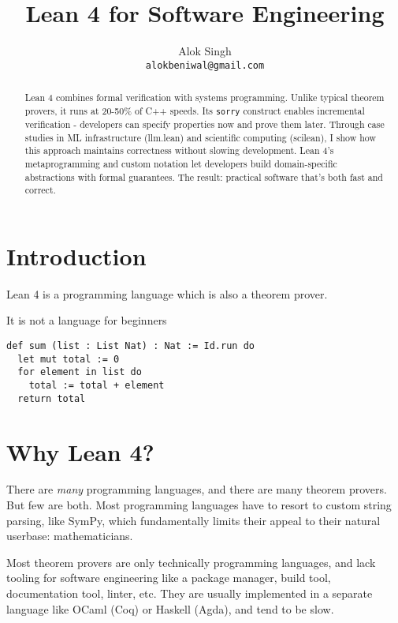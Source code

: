 \documentclass{article}
\title{Lean 4 for Software Engineering}
\author{
  Alok Singh \\
  \texttt{alokbeniwal@gmail.com} \\
}
\begin{document}
\maketitle

\begin{abstract}
  Lean 4 combines formal verification with systems programming. Unlike typical
  theorem provers, it runs at 20-50\% of C++ speeds. Its \texttt{sorry} construct
  enables incremental verification - developers can specify properties now and
  prove them later. Through case studies in ML infrastructure (llm.lean) and
  scientific computing (scilean), I show how this approach maintains correctness
  without slowing development. Lean 4's metaprogramming and custom notation let
  developers build domain-specific abstractions with formal guarantees. The result:
  practical software that's both fast and correct.
\end{abstract}

\tableofcontents

\section{Introduction}
Lean 4 is a programming language which is also a theorem prover.

It is not a language for beginners

\begin{verbatim}
def sum (list : List Nat) : Nat := Id.run do
  let mut total := 0
  for element in list do
    total := total + element
  return total
\end{verbatim}

\section{Why Lean 4?}

There are \textit{many} programming languages, and there are many theorem provers. But few are both. Most programming languages have to resort to custom string parsing, like SymPy, which fundamentally limits their appeal to their natural userbase: mathematicians.

Most theorem provers are only technically programming languages, and lack tooling for software engineering like a package manager, build tool, documentation tool, linter, etc. They are usually implemented in a separate language like OCaml (Coq) or Haskell (Agda), and tend to be slow.
\end{document}
